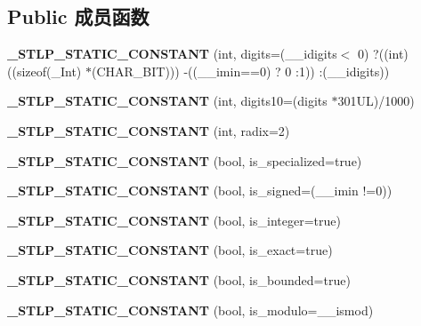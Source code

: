 \subsection*{Public 成员函数}
\begin{DoxyCompactItemize}
\item 
\mbox{\label{class___integer__limits_a527f65b3dc91bd3df0bad478d59879a2}} 
{\bfseries \+\_\+\+S\+T\+L\+P\+\_\+\+S\+T\+A\+T\+I\+C\+\_\+\+C\+O\+N\+S\+T\+A\+NT} (int, digits=(\+\_\+\+\_\+idigits$<$ 0) ?((int)((sizeof(\+\_\+\+Int) $\ast$(C\+H\+A\+R\+\_\+\+B\+IT))) -\/((\+\_\+\+\_\+imin==0) ? 0 \+:1)) \+:(\+\_\+\+\_\+idigits))
\item 
\mbox{\label{class___integer__limits_af1cc9204fe1d32947ddfdccd24fafddb}} 
{\bfseries \+\_\+\+S\+T\+L\+P\+\_\+\+S\+T\+A\+T\+I\+C\+\_\+\+C\+O\+N\+S\+T\+A\+NT} (int, digits10=(digits $\ast$301\+U\+L)/1000)
\item 
\mbox{\label{class___integer__limits_ad8ec19dfa49c3fe2d8ce6b03754c8041}} 
{\bfseries \+\_\+\+S\+T\+L\+P\+\_\+\+S\+T\+A\+T\+I\+C\+\_\+\+C\+O\+N\+S\+T\+A\+NT} (int, radix=2)
\item 
\mbox{\label{class___integer__limits_a40edb6cab4d0b964c322cf3137151c8c}} 
{\bfseries \+\_\+\+S\+T\+L\+P\+\_\+\+S\+T\+A\+T\+I\+C\+\_\+\+C\+O\+N\+S\+T\+A\+NT} (bool, is\+\_\+specialized=true)
\item 
\mbox{\label{class___integer__limits_a72b9ecaf75a3c3c75c749ba8d06ef317}} 
{\bfseries \+\_\+\+S\+T\+L\+P\+\_\+\+S\+T\+A\+T\+I\+C\+\_\+\+C\+O\+N\+S\+T\+A\+NT} (bool, is\+\_\+signed=(\+\_\+\+\_\+imin !=0))
\item 
\mbox{\label{class___integer__limits_acdb37a4195505c79f8c2e9bce003bc72}} 
{\bfseries \+\_\+\+S\+T\+L\+P\+\_\+\+S\+T\+A\+T\+I\+C\+\_\+\+C\+O\+N\+S\+T\+A\+NT} (bool, is\+\_\+integer=true)
\item 
\mbox{\label{class___integer__limits_ae7f7b43e83b677f5c8774223a7b7ae30}} 
{\bfseries \+\_\+\+S\+T\+L\+P\+\_\+\+S\+T\+A\+T\+I\+C\+\_\+\+C\+O\+N\+S\+T\+A\+NT} (bool, is\+\_\+exact=true)
\item 
\mbox{\label{class___integer__limits_ae201981369c8d490eeb96fc66e80880d}} 
{\bfseries \+\_\+\+S\+T\+L\+P\+\_\+\+S\+T\+A\+T\+I\+C\+\_\+\+C\+O\+N\+S\+T\+A\+NT} (bool, is\+\_\+bounded=true)
\item 
\mbox{\label{class___integer__limits_a368ec7d5a99d57b7db90f39c21eba1de}} 
{\bfseries \+\_\+\+S\+T\+L\+P\+\_\+\+S\+T\+A\+T\+I\+C\+\_\+\+C\+O\+N\+S\+T\+A\+NT} (bool, is\+\_\+modulo=\+\_\+\+\_\+ismod)
\end{DoxyCompactItemize}
